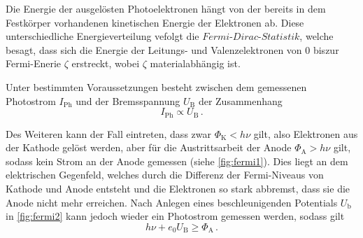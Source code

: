 Die Energie der ausgelösten Photoelektronen hängt von der bereits in dem Festkörper vorhandenen kinetischen Energie der Elektronen ab.
Diese unterschiedliche Energieverteilung vefolgt die $\textit{Fermi-Dirac-Statistik}$, welche besagt,
dass sich die Energie der Leitungs- und Valenzelektronen von 0 biszur Fermi-Enerie $\zeta$ erstreckt, 
wobei $\zeta$ materialabhängig ist.

Unter bestimmten Voraussetzungen besteht zwischen dem gemessenen Photostrom $I_\text{Ph}$
und der Bremsspannung $U_\text{B}$ der Zusammenhang
\begin{equation*}
    I_\text{Ph} \propto U_\text{B} \, .
\end{equation*}

Des Weiteren kann der Fall eintreten, dass zwar $\Phi_\text{K} < h \nu$ gilt, 
also Elektronen aus der Kathode gelöst werden, 
aber für die Austrittsarbeit der Anode $\Phi_\text{A} > h \nu$ gilt, 
sodass kein Strom an der Anode gemessen (siehe \autoref{fig:fermi1}).
Dies liegt an dem elektrischen Gegenfeld, welches durch die Differenz der
Fermi-Niveaus von Kathode und Anode entsteht und die Elektronen so stark abbremst, 
dass sie die Anode nicht mehr erreichen.
Nach Anlegen eines beschleunigenden Potentials $U_\text{b}$ in \autoref{fig:fermi2}
kann jedoch wieder ein Photostrom gemessen werden, sodass gilt
\begin{equation}
    h \nu + e_{0} U_\text{B} \geq \Phi_\text{A} \, .    \label{eq:beschleunigendes_Potential}
\end{equation}

